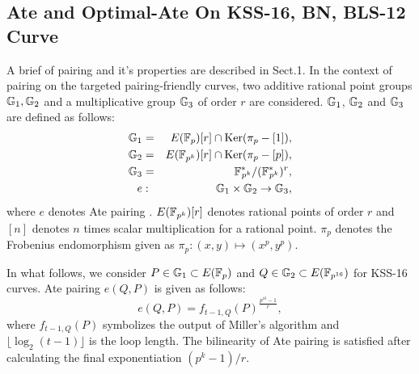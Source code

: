\subsection{Ate and Optimal-Ate On KSS-16, BN, BLS-12 Curve}
\label{sec:ch:indo:optate_ksss16}

A brief of pairing and it's properties are described in Sect.1.  
In the context of pairing on the targeted pairing-friendly curves, two additive rational point groups ${\mathbb{G}}_{1}, {\mathbb{G}}_{2}$ and a multiplicative group ${\mathbb{G}}_{3}$ of order $r$ are considered. 
${\mathbb{G}}_{1}$, ${\mathbb{G}}_{2}$ and ${\mathbb{G}}_{3}$ are defined as follows:
\begin{eqnarray}
{\mathbb{G}}_{1} & = &  E(\mathbb{F}_p) [r] \cap \text{Ker}(\pi_p - [1]), \nonumber \\
{\mathbb{G}}_{2} & = &  E({\mathbb{F}}_{p^{k}}) [r] \cap \text{Ker}(\pi_p - [p]), \nonumber \\
{\mathbb{G}}_{3} & = & {{\mathbb{F}}^{\ast}}_{\!\!\!p^{k}}/({{\mathbb{F}}^{\ast}}_{\!\!\!p^{k}})^r, \nonumber \\
 e & : &{\mathbb{G}}_{1} \times {\mathbb{G}}_{2} \rightarrow {\mathbb{G}}_{3},
\end{eqnarray}
where $e$ denotes Ate pairing \cite{DBLP:reference/crc/2005ehcc}. $E({\mathbb{F}}_{p^{k}})[r]$ denotes rational points of order $r$ and $[n]$ denotes $n$ times scalar multiplication for a rational point. 
$\pi_p$ denotes the Frobenius endomorphism given as $\pi_p: (x,y) \mapsto (x^p,y^p)$.

In what follows, we consider $P \in {\mathbb{G}}_{1} \subset E(\mathbb{F}_p)$ and  $Q \in {\mathbb{G}}_{2} \subset  E(\mathbb{F}_{p^{16}})$ for KSS-16 curves.
Ate pairing $e(Q,P)$ is given as follows:
\begin{equation}
	e(Q,P)=f_{t-1,Q}(P)^{\frac{p^{16}-1}{r}},
\end{equation}
where $f_{t-1,Q}(P)$ symbolizes the output of Miller's algorithm and $\lfloor \log_2 (t-1) \rfloor$ is the loop length. The bilinearity of Ate pairing is satisfied after calculating the final exponentiation $(p^k-1)/r$.

